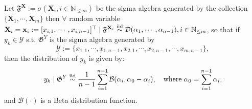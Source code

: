 \begin{prop}\label{prop:mixture_beta}
    Let $\mathfrak{F}^{\mathbf{X}}:=\sigma(\mathbf{X}_i, i\in\mathbb{N}_{\leq m})$ be the sigma algebra generated by the collection $\{\mathbf{X}_1, \cdots, \mathbf{X}_m\}$ then $\forall$ random variable $\mathbf{X}_i=\mathbf{x}_i:=[x_{i,1},\cdots,x_{i,n-1}]^{\top}\mid\mathfrak{F}^{\mathbf{X}_i}\overset{\textnormal{iid}}{\sim}\mathcal{D}(\alpha_1,\cdots,\alpha_{n-1}),i\in\mathbb{N}_{\leq m}$, so that if $y_k\in\mathscr{Y}$ s.t. $\mathfrak{G}^{Y}$ is the sigma algebra generated by 
    \begin{equation}
        \mathscr{Y}:=\{x_{1,1},\cdots,x_{1,n-1},x_{2,1},\cdots,x_{2,n-1},\cdots,x_{m,n-1}\},
    \end{equation}
    then the distribution of $y_k$ is given by:
\begin{equation}
y_k\mid\mathfrak{G}^{Y}\overset{\textnormal{iid}}{\sim}\frac{1}{n-1}\sum_{i=1}^{n-1}\mathcal{B}(\alpha_i,\alpha_0-\alpha_i),\quad\text{where}\;\alpha_0=\sum_{i=1}^{n-1}\alpha_i,
\end{equation}
and $\mathcal{B}(\cdot)$ is a Beta distribution function.
\end{prop}
